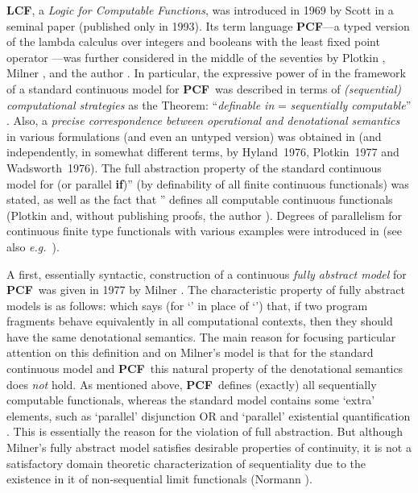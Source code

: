 \documentclass[fleqn]{LMCS}
\theoremstyle{plain}\newtheorem{satz}[thm]{Satz}
\theoremstyle{plain}\newtheorem{hyp}[thm]{Hypothesis}
\theoremstyle{plain}\newtheorem{hyps}[thm]{Hypotheses}
\theoremstyle{definition}\newtheorem{note}[thm]{Note}
\def\eg{{\em e.g.}}
\newcommand{\PCF}{\mbox{\bf PCF}}
\newcommand{\LCF}{\mbox{\bf LCF}}
\newcommand{\Y}{\mbox{\bf Y}}
\newcommand{\IF}{\mbox{\bf if}}
\newcommand{\fla}[1]{}
\newcommand{\?}{\mbox{?}}
\begin{document}
\noindent
\LCF, a \emph{Logic for Computable Functions}, 
was introduced in 1969 by Scott 
in a seminal paper \cite{Scott93} (published only in 1993). 
Its term language \PCF---a typed version of the lambda calculus 
over integers and booleans with the 
least fixed point operator \fla{\Y}---was further considered in the middle 
of the seventies by Plotkin \cite{Plotkin77}, 
Milner \cite{Milner77}, and the author 
\cite{Saz76d,Saz76AL,Saz76SMZH,Saz76t}. 
In particular, the expressive power of \fla{\PCF} in the framework 
of a standard continuous model  
for \PCF\ was described 
in terms of 
\emph{(sequential) computational strategies} 
as the Theorem:  
``\emph{definable in \fla{\PCF}} = 
\emph{sequentially computable}'' \cite{Saz76AL}. 
Also, a 
\emph{precise correspondence between operational 
and denotational semantics}  
in various formulations (and even an untyped version) 
was 
obtained in \cite{Saz76SMZH} (and independently, 
in somewhat different terms, by Hyland~1976, 
Plotkin~1977 and Wadsworth~1976). 
The full abstraction property of the standard continuous model for 
 (or parallel \IF)''
(by definability of all finite continuous functionals) 
was stated, as well as the fact that 
\fla{\PCF^{++}=\textrm{``}\PCF+\mbox{ parallel OR}+\exists}'' 
defines  
all computable 
continuous functionals (Plotkin \cite{Plotkin77} and, 
without publishing proofs, 
the author \cite{Saz76d,Saz76AL}).
Degrees of parallelism for continuous 
finite type functionals with various examples 
were introduced in \cite{Saz76d} 
(see also \eg\ \cite{Bucciarelli97Degrees,MTrakhte76TCS}). 

A first, essentially syntactic, construction of 
a continuous \emph{fully abstract model} for \PCF\ 
was given in 1977 by Milner 
\cite{Milner77}. The characteristic property of fully abstract models 
is as follows: 
which says (for `' in place of `') that, if two program fragments 
behave equivalently in all computational contexts, then they 
should have the same denotational semantics. The main reason for focusing 
particular attention on this definition and on Milner's model 
is that for the standard continuous 
model   and \PCF\ this natural property 
of the denotational 
semantics does \emph{not} hold. As mentioned above, \PCF\ defines 
(exactly) all sequentially computable functionals, whereas the 
standard model contains some `extra' elements, such as 
`parallel' disjunction OR  and 
`parallel' existential quantification 
. This is essentially the reason 
for the violation of full abstraction. 
But although Milner's fully abstract model 
satisfies desirable properties of continuity, 
it is not a satisfactory domain theoretic characterization of sequentiality 
due to the existence in it of non-sequential 
limit functionals (Normann \cite{Normann2004}). 
\end{document}
